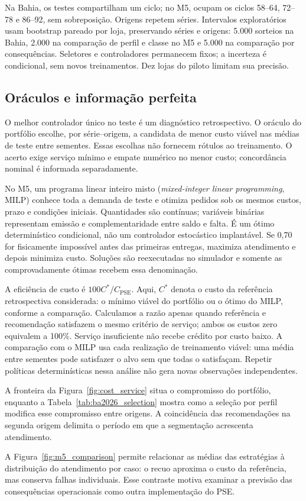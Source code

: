 \documentclass[preprint,12pt]{elsarticle}
\begin{document}
Na Bahia, os testes compartilham um ciclo; no M5, ocupam os ciclos 58--64, 72--78 e 86--92, sem sobreposição. Origens repetem séries. Intervalos exploratórios usam bootstrap pareado por loja, preservando séries e origens: 5.000 sorteios na Bahia, 2.000 na comparação de perfil e classe no M5 e 5.000 na comparação por consequências. Seletores e controladores permanecem fixos; a incerteza é condicional, sem novos treinamentos. Dez lojas do piloto limitam sua precisão.

\subsection{Oráculos e informação perfeita}
O melhor controlador único no teste é um diagnóstico retrospectivo. O oráculo do portfólio escolhe, por série--origem, a candidata de menor custo viável nas médias de teste entre sementes. Essas escolhas não fornecem rótulos ao treinamento. O acerto exige serviço mínimo e empate numérico no menor custo; concordância nominal é informada separadamente.

No M5, um programa linear inteiro misto (\textit{mixed-integer linear programming}, MILP) conhece toda a demanda de teste e otimiza pedidos sob os mesmos custos, prazo e condições iniciais. Quantidades são contínuas; variáveis binárias representam emissão e complementaridade entre saldo e falta. É um ótimo determinístico condicional, não um controlador estocástico implantável. Se 0,70 for fisicamente impossível antes das primeiras entregas, maximiza atendimento e depois minimiza custo. Soluções são reexecutadas no simulador e somente as comprovadamente ótimas recebem essa denominação.

A eficiência de custo é $100C^*/C_{\mathrm{PSE}}$. Aqui, $C^*$ denota o custo da referência retrospectiva considerada: o mínimo viável do portfólio ou o ótimo do MILP, conforme a comparação. Calculamos a razão apenas quando referência e recomendação satisfazem o mesmo critério de serviço; ambos os custos zero equivalem a 100\%. Serviço insuficiente não recebe crédito por custo baixo. A comparação com o MILP usa cada realização de treinamento viável: uma média entre sementes pode satisfazer o alvo sem que todas o satisfaçam. Repetir políticas determinísticas nessa análise não gera novas observações independentes.


A fronteira da Figura~\ref{fig:cost_service} situa o compromisso do portfólio, enquanto a Tabela~\ref{tab:ba2026_selection} mostra como a seleção por perfil modifica esse compromisso entre origens. A coincidência das recomendações na segunda origem delimita o período em que a segmentação acrescenta atendimento.

A Figura~\ref{fig:m5_comparison} permite relacionar as médias das estratégias à distribuição do atendimento por caso: o recuo aproxima o custo da referência, mas conserva falhas individuais. Esse contraste motiva examinar a previsão das consequências operacionais como outra implementação do PSE.

\end{document}
